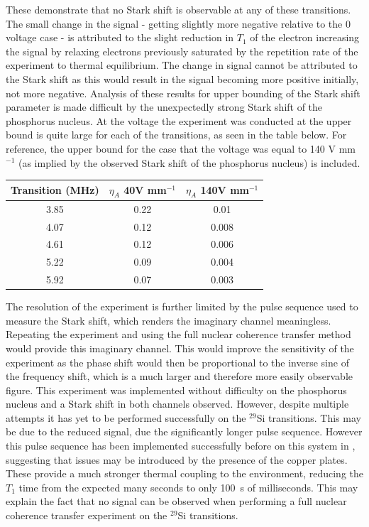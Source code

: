 These demonstrate that no Stark shift is observable at any of these transitions. 
The small change in the signal - getting slightly more negative relative to the 0 voltage case - is attributed to the slight reduction in $T_1$ of the electron increasing the signal by relaxing electrons previously saturated by the repetition rate of the experiment to thermal equilibrium. 
The change in signal cannot be attributed to the Stark shift as this would result in the signal becoming more positive initially, not more negative. 
Analysis of these results for upper bounding of the Stark shift parameter is made difficult by the unexpectedly strong Stark shift of the phosphorus nucleus.
At the voltage the experiment was conducted at the upper bound is quite large for each of the transitions, as seen in the table below.
For reference, the upper bound for the case that the voltage was equal to 140 V mm$^{-1}$ (as implied by the observed Stark shift of the phosphorus nucleus) is included. 

\begin{center}
\begin{tabular}{||c || c | c ||}
\hline
Transition (MHz)& $\eta_A$ 40V mm$^{-1}$ & $\eta_A$ 140V mm$^{-1}$\\
\hline
3.85 & 0.22 & 0.01\\
4.07 & 0.12 & 0.008\\
4.61 & 0.12 & 0.006\\
5.22 & 0.09 & 0.004\\
5.92 & 0.07 & 0.003\\
\hline
\end{tabular}
\end{center}

The resolution of the experiment is further limited by the pulse sequence used to measure the Stark shift, which renders the imaginary channel meaningless.
Repeating the experiment and using the full nuclear coherence transfer method would provide this imaginary channel.
This would improve the sensitivity of the experiment as the phase shift would then be proportional to the inverse sine of the frequency shift, which is a much larger and therefore more easily observable figure.
This experiment was implemented without difficulty on the phosphorus nucleus and a Stark shift in both channels observed.
However, despite multiple attempts it has yet to be performed successfully on the $^{29}$Si transitions.
This may be due to the reduced signal, due the significantly longer pulse sequence.
However this pulse sequence has been implemented successfully before on this system in \cite{Wolfowicz2016a}, suggesting that issues may be introduced by the presence of the copper plates.
These provide a much stronger thermal coupling to the environment, reducing the $T_1$ time from the expected many seconds to only 100~s of milliseconds. 
This may explain the fact that no signal can be observed when performing a full nuclear coherence transfer experiment on the $^{29}$Si transitions.
\\